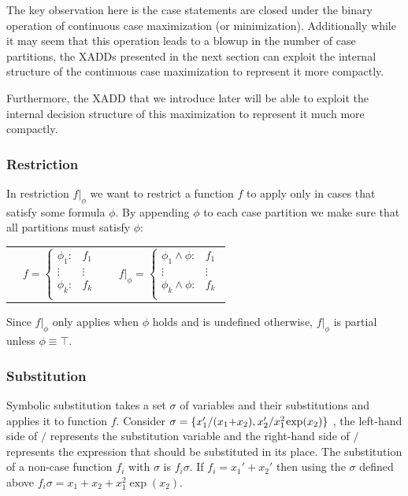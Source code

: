 \documentclass[twoside,11pt]{article}
\begin{document}
The key observation here is the case statements are closed under the binary operation of continuous case maximization (or minimization). Additionally while it may seem that this operation leads to a blowup in the number of case partitions, the XADDs presented in the next section can exploit the internal structure of the continuous case maximization to represent it more compactly. 

Furthermore, the 
XADD that we introduce later will be able to exploit the 
internal decision structure of this
maximization to represent it much more compactly.

\subsubsection*{Restriction}
In restriction $f|_{\phi}$ %
we want to restrict a function $f$ to apply only in cases
that satisfy some formula $\phi$.  
By appending $\phi$ to each case partition we make sure that all partitions must satisfy $\phi$:

{%
\begin{center}
\begin{tabular}{r c c l}
&
\hspace{-6mm} 
  $f = \begin{cases}
    \phi_1: & f_1 \\ 
   \vdots&\vdots\\ 
    \phi_k: & f_k \\ 
  \end{cases}$
&

&
\hspace{-2mm}
  $f|_{\phi} = \begin{cases}
    \phi_1 \land \phi : & f_1 \\ 
   \vdots&\vdots\\ 
    \phi_k \land \phi : & f_k \\ 
  \end{cases}$
\end{tabular}
\end{center}
}
Since $f|_{\phi}$ only applies when $\phi$ holds and is
undefined otherwise, $f|_{\phi}$ is partial unless $\phi \equiv \top$.

\subsubsection*{Substitution}
Symbolic substitution takes
a set $\sigma$ of variables and their substitutions and applies it to function $f$. 
Consider $\sigma = \{ x_1' / (x_1 \hspace{-.8mm} + \hspace{-.8mm} x_2), x_2' / x_1^2 \hspace{-.3mm} \exp(x_2) \}$
, the left-hand side of $/$ represents the substitution variable and the
right-hand side of $/$ represents the expression that should be substituted in its place.  
The substitution of a non-case function $f_i$ with $\sigma$ 
is $f_i\sigma$. If
$f_i = x_1' + x_2'$ then using the $\sigma$ defined above $f_i\sigma = x_1 + x_2 + x_1^2 \exp(x_2)$.  
\end{document}
